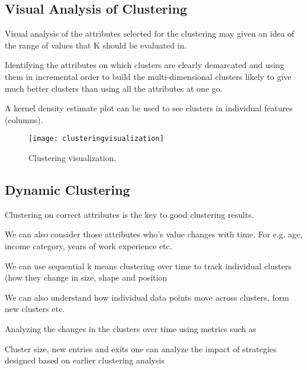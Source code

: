	\subsection{Visual Analysis of Clustering}
	\begin{bulletedlist}
		\item Visual analysis of the attributes selected for the clustering may given an idea of the range of values that K should be evaluated in.
		\item Identifying the attributes on which clusters are clearly demarcated and using them in incremental order to build the multi-dimensional clusters likely to give much better clusters than using all the attributes at one go.
		\item A kernel density estimate plot can be used to see clusters in individual features (columns).
	\end{bulletedlist}

	\begin{figure}[h]
		\centering
		\texttt{[image: clusteringvisualization]}
		\caption{Clustering visualization.}
		\label{fig:clusteringvisualization}
	\end{figure}

	\subsection{Dynamic Clustering}
	\begin{bulletedlist}
		\item Clustering on correct attributes is the key to good clustering results.
		\item We can also consider those attributes who's value changes with time. For e.g. age, income category, years of work experience etc.
		\item We can use sequential k means clustering over time to track individual clusters (how they change in size, shape and position
		\item We can also understand how individual data points move across clusters, form new clusters etc.
		\item Analyzing the changes in the clusters over time using metrics such as
		\item Cluster size, new entries and exits one can analyze the impact of strategies designed based on earlier clustering analysis
	\end{bulletedlist}
